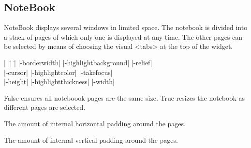 \subsection*{NoteBook}
NoteBook displays several windows in limited space. The notebook is
divided into a stack of pages of which only one is
displayed at any time. The other pages can be selected by
means of choosing the visual <tabs> at the top of the widget.
\vskip5pt
\vspace{-4pt}

\begin{tabbing}
|                   |\=|                     |\= \kill
|-borderwidth|      \> |-highlightbackground| \> |-relief| \\
|-cursor|           \> |-highlightcolor|      \> |-takefocus| \\
|-height|	    \> |-highlightthickness|  \> |-width| \\
\end{tabbing}

\vskip5pt

\begin{enum}{1cm}

False ensures all noteboook pages are the same size.  True resizes the notebook 
as different pages are selected.

The amount of internal horizontal padding around the pages. 

The amount of internal vertical padding around the pages. 

\end{enum}

\vskip5pt

